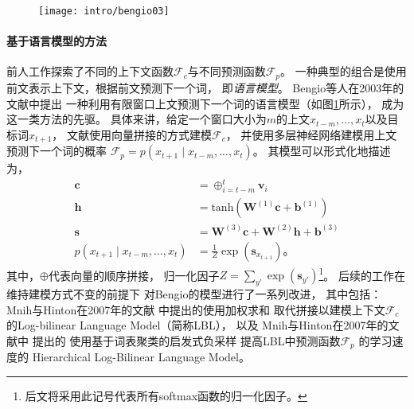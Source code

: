 \begin{figure}[t]
	\centering
	\texttt{[image: intro/bengio03]}
	\label{fig:intro:bengio03}
\end{figure}

\paragraph{基于语言模型的方法}
前人工作探索了不同的上下文函数$\mathcal{F}_{c}$与不同预测函数$\mathcal{F}_{p}$。
一种典型的组合是使用前文表示上下文，根据前文预测下一个词，
即\textit{语言模型}。
Bengio等人在2003年的文献中提出
一种利用有限窗口上文预测下一个词的语言模型（如图\ref{fig:intro:bengio03}所示），
成为这一类方法的先驱。
具体来讲，给定一个窗口大小为$m$的上文$x_{t-m}, ..., x_{t}$以及目标词$x_{t+1}$，
文献使用向量拼接的方式建模$\mathcal{F}_{c}$，
并使用多层神经网络建模用上文预测下一个词的概率
$\mathcal{F}_{p} = p(x_{t+1} \mid x_{t-m}, ..., x_{t})$。
其模型可以形式化地描述为，
\begin{align*}
\mathbf{c} &= \oplus_{i=t-m}^{t} \mathbf{v}_i \\
\mathbf{h} &= \text{tanh}(\mathbf{W}^{(1)} \mathbf{c} + \mathbf{b}^{(1)}) \\
\mathbf{s} &= \mathbf{W}^{(3)} \mathbf{c} + \mathbf{W}^{(2)} \mathbf{h} + \mathbf{b}^{(3)}\\
p(x_{t+1} \mid x_{t-m}, ..., x_t) &= \frac{1}{Z} \exp(\mathbf{s}_{x_{t+1}})\text{。}
\end{align*}
其中，$\oplus$代表向量的顺序拼接，
归一化因子$Z = \sum_{y'} \exp(\mathbf{s}_{y'})$\footnote{后文将采用此记号代表所有softmax函数的归一化因子。}。
后续的工作在维持建模方式不变的前提下
对Bengio的模型进行了一系列改进，
其中包括：
Mnih与Hinton在2007年的文献
中提出的使用加权求和
取代拼接以建模上下文$\mathcal{F}_{c}$
的Log-bilinear Language Model（简称LBL），
以及
Mnih与Hinton在2007年的文献中
提出的
使用基于词表聚类的启发式负采样
提高LBL中预测函数$\mathcal{F}_{p}$
的学习速度的
Hierarchical Log-Bilinear Language Model。

